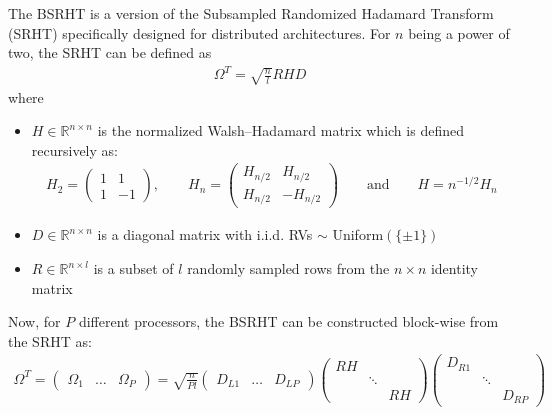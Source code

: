 \documentclass{article}
\theoremstyle{definition}
\begin{document}
The BSRHT is a version of the Subsampled Randomized Hadamard Transform (SRHT) specifically designed for distributed architectures. For $n$ being a power of two, the SRHT can be defined as
\begin{align*}
    \Omega^T = \sqrt{\frac{n}{l}} R H D
\end{align*}
where
\begin{itemize}
    \item $H\in \mathbb{R}^{n \times n}$ is the normalized Walsh–Hadamard matrix which is defined recursively as:
    \begin{align*}
        H_2 = \begin{pmatrix}
            1 & 1 \\
            1 & -1
        \end{pmatrix}, 
        \qquad
        H_n = \begin{pmatrix}
            H_{n/2} & H_{n/2}\\
            H_{n/2} & -H_{n/2}
        \end{pmatrix}
        \qquad \text{and} \qquad
        H = n^{-1/2} H_n
    \end{align*}
    \item $D\in \mathbb{R}^{n \times n}$ is a diagonal matrix with i.i.d. RVs $\sim$ Uniform$(\{\pm 1\})$
    \item $R\in \mathbb{R}^{n \times l}$ is a subset of $l$ randomly sampled rows from the $n \times n$ identity matrix
\end{itemize}
Now, for $P$ different processors, the BSRHT can be constructed block-wise from the SRHT as:
\begin{align}
    \label{BRSHT}
    \Omega^T
    = \begin{pmatrix}
        \Omega_1 & \ldots & \Omega_P 
    \end{pmatrix} 
    = \sqrt{\frac{n}{Pl}} 
    \begin{pmatrix}
        D_{L1} & \ldots & D_{LP} 
    \end{pmatrix} 
    \begin{pmatrix}
        RH \\
        & \ddots \\
        && RH
    \end{pmatrix}
    \begin{pmatrix}
        D_{R1}\\
        & \ddots \\
        && D_{RP}
    \end{pmatrix}
\end{align}
\end{document}
